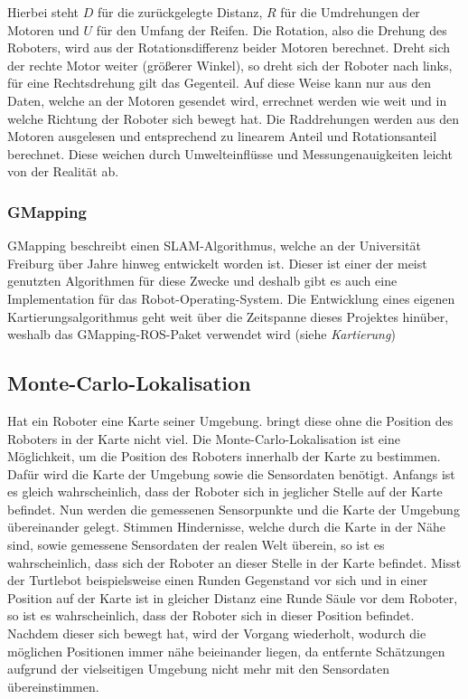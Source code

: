 {{{			Hierbei steht $D$ für die zurückgelegte Distanz, $R$ für die Umdrehungen der Motoren und $U$ für den Umfang der Reifen. Die Rotation, also die Drehung des Roboters, wird aus der Rotationsdifferenz beider Motoren berechnet. Dreht sich der rechte Motor weiter (größerer Winkel), so dreht sich der Roboter nach links, für eine Rechtsdrehung gilt das Gegenteil.
			Auf diese Weise kann nur aus den Daten, welche an der Motoren gesendet wird, errechnet werden wie weit und in welche Richtung der Roboter sich bewegt hat.
			Die Raddrehungen werden aus den Motoren ausgelesen und entsprechend zu linearem Anteil und Rotationsanteil berechnet. Diese weichen durch Umwelteinflüsse und Messungenauigkeiten leicht von der Realität ab.
			
			
		\subsubsection{GMapping}
		{
			GMapping beschreibt einen SLAM-Algorithmus, welche an der Universität Freiburg über Jahre hinweg entwickelt worden ist. Dieser ist einer der  meist genutzten Algorithmen für diese Zwecke und deshalb gibt es auch eine Implementation für das Robot-Operating-System. Die Entwicklung eines eigenen Kartierungsalgorithmus geht weit über die Zeitspanne dieses Projektes hinüber, weshalb das GMapping-ROS-Paket verwendet wird (siehe \emph{Kartierung}) %
			
		}
	}

	\subsection{Monte-Carlo-Lokalisation}
	{ 
		Hat ein Roboter eine Karte seiner Umgebung. bringt diese ohne die Position des Roboters in der Karte nicht viel. Die Monte-Carlo-Lokalisation ist eine Möglichkeit, um die Position des Roboters innerhalb der Karte zu bestimmen.  Dafür wird die Karte der Umgebung sowie die Sensordaten benötigt. Anfangs ist es gleich wahrscheinlich, dass der Roboter sich in jeglicher Stelle auf der Karte befindet. Nun werden die gemessenen Sensorpunkte und die Karte der Umgebung übereinander gelegt. Stimmen Hindernisse, welche durch die Karte in der Nähe sind, sowie gemessene Sensordaten der realen Welt überein, so ist es wahrscheinlich, dass sich der Roboter an dieser Stelle in der Karte befindet. Misst der Turtlebot beispielsweise einen Runden Gegenstand vor sich und in einer Position auf der Karte ist in gleicher Distanz eine Runde Säule vor dem Roboter, so ist es wahrscheinlich, dass der Roboter sich in dieser Position befindet. Nachdem dieser sich bewegt hat, wird der Vorgang wiederholt, wodurch die möglichen Positionen immer nähe beieinander liegen, da entfernte Schätzungen aufgrund der vielseitigen Umgebung nicht mehr mit den Sensordaten übereinstimmen. 
	}
}}
